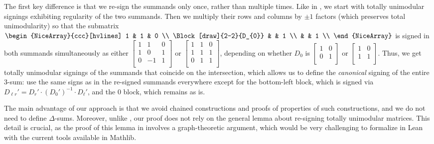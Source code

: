 The first key difference is that we re-sign the summands only once, rather than multiple times. Like in \cite{Truemper2016}, we start with totally unimodular signings exhibiting regularity of the two summands. Then we multiply their rows and columns by $\pm 1$ factors (which preserves total unimodularity) so that the submatrix $
\begin{NiceArray}{ccc}[hvlines]
    1 & 1 & 0 \\
    \Block[draw]{2-2}{D_{0}} & & 1 \\
    & & 1 \\
\end{NiceArray}
$ is signed in both summands simultaneously as either $
\begin{bmatrix}
    1 & 1 & 0 \\
    1 & 0 & 1 \\
    0 & -1 & 1 \\
\end{bmatrix}
$ or $
\begin{bmatrix}
    1 & 1 & 0 \\
    1 & 1 & 1 \\
    0 & 1 & 1 \\
\end{bmatrix}
$, depending on whether $D_{0}$ is $\begin{bmatrix} 1 & 0 \\ 0 & 1 \\ \end{bmatrix}$ or $\begin{bmatrix} 1 & 0 \\ 1 & 1 \\ \end{bmatrix}$. Thus, we get totally unimodular signings of the summands that coincide on the intersection, which allows us to define the \emph{canonical} signing of the entire 3-sum: use the same signs as in the re-signed summands everywhere except for the bottom-left block, which is signed via $D_{\ell r}' = D_{r}' \cdot (D_{0}')^{-1} \cdot D_{\ell}'$, and the $0$ block, which remains as is.

The main advantage of our approach is that we avoid chained constructions and proofs of properties of such constructions, and we do not need to define $\Delta$-sums. Moreover, unlike \cite{Truemper2016}, our proof does not rely on the general lemma about re-signing totally unimodular matrices. This detail is crucial, as the proof of this lemma in \cite{Truemper2016} involves a graph-theoretic argument, which would be very challenging to formalize in Lean with the current tools available in Mathlib.

